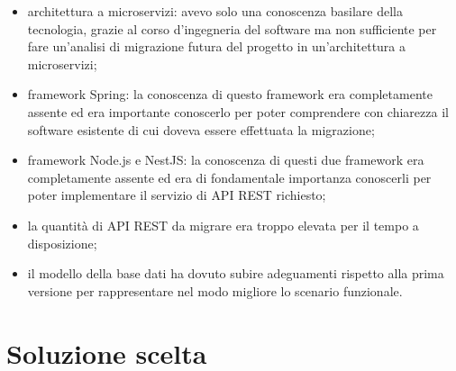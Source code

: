 \begin{itemize}
    \item architettura a microservizi: avevo solo una conoscenza basilare
          della tecnologia, grazie al corso d'ingegneria del software ma non
          sufficiente per fare un'analisi di migrazione futura del progetto in un'architettura a microservizi;
    \item framework Spring: la conoscenza di questo framework era completamente assente
        ed era importante conoscerlo per poter comprendere con chiarezza il software esistente
        di cui doveva essere effettuata la migrazione;
    \item framework Node.js e NestJS: la conoscenza di questi due framework era completamente
        assente ed era di fondamentale importanza conoscerli per poter implementare il servizio
        di \gls{API} \gls{REST} richiesto;
    \item la quantità di \gls{API} \gls{REST} da migrare era troppo elevata per il tempo a disposizione;
    \item il modello della base dati ha dovuto subire adeguamenti rispetto alla prima versione
        per rappresentare nel modo migliore lo scenario funzionale.
\end{itemize}

\section{Soluzione scelta}

